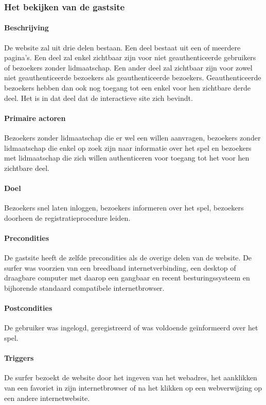 \subsubsection{Het bekijken van de gastsite}
\paragraph{Beschrijving}De website zal uit drie delen bestaan. Een deel bestaat uit een of meerdere pagina's. Een deel zal enkel zichtbaar zijn voor niet geauthenticeerde gebruikers of bezoekers zonder lidmaatschap. Een ander deel zal zichtbaar zijn voor zowel niet geauthenticeerde bezoekers als geauthenticeerde bezoekers. Geauthenticeerde bezoekers hebben dan ook nog toegang tot een enkel voor hen zichtbare derde deel. Het is in dat deel dat de interactieve site zich bevindt.
\paragraph{Primaire actoren} Bezoekers zonder lidmaatschap die er wel een willen aanvragen, bezoekers zonder lidmaatschap die enkel op zoek zijn naar informatie over het spel en bezoekers met lidmaatschap die zich willen authenticeren voor toegang tot het voor hen zichtbare deel.
\paragraph{Doel} Bezoekers snel laten inloggen, bezoekers informeren over het spel, bezoekers doorheen de registratieprocedure leiden.
\paragraph{Precondities} De gastsite heeft de zelfde precondities als de overige delen van de website. De surfer was voorzien van een breedband internetverbinding, een desktop of draagbare computer met daarop een gangbaar en recent besturingssysteem en bijhorende standaard compatibele internetbrowser.
\paragraph{Postcondities} De gebruiker was ingelogd, geregistreerd of was voldoende geïnformeerd over het spel.
\paragraph{Triggers} De surfer bezoekt de website door het ingeven van het webadres, het aanklikken van een favoriet in zijn internetbrowser of na het klikken op een webverwijzing op een andere internetwebsite.
